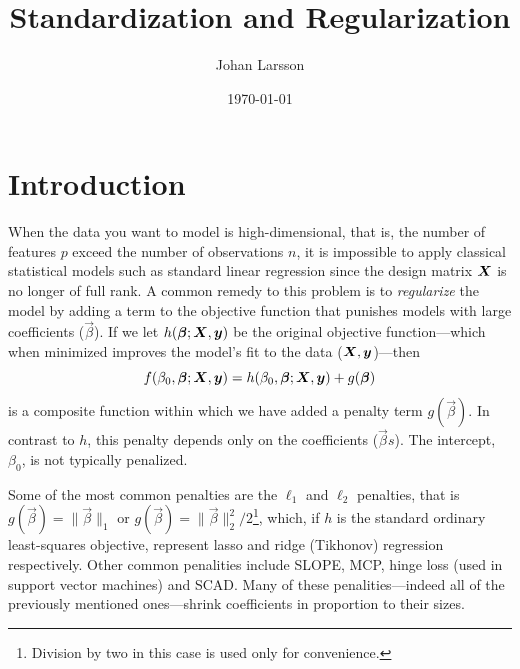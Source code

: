 


\newcommand{\mv}[1]{{\boldsymbol{\mathrm{#1}}}}

\title{Standardization and Regularization}
\author[1,*]{Johan Larsson}
\date{\today}

\usepackage[style=alphabetic]{biblatex}




\maketitle

\section{Introduction}

When the data you want to model is high-dimensional, that is, the number of features \(p\) exceed the number of observations \(n\), it is impossible to apply classical statistical models such as standard linear regression since the design matrix \(\boldsymbol X\) is no longer of full rank. A common remedy to this problem is to \emph{regularize} the model by adding a term to the objective function that punishes models with large coefficients (\(\vec\beta\)). If we let \(h(\boldsymbol\beta; \boldsymbol X, \boldsymbol y)\) be the original objective function---which when minimized improves the model's fit to the data (\(\boldsymbol X, \boldsymbol y\))---then
\[
  f(\beta_0, \boldsymbol\beta; \boldsymbol X, \boldsymbol y) = h(\beta_0, \boldsymbol\beta; \boldsymbol X, \boldsymbol y) + g(\boldsymbol\beta)
\]
is a composite function within which we have added a penalty term \(g(\vec\beta)\).
In contrast to \(h\), this penalty depends only on the coefficients (\(\vec{\beta}s\)).
The intercept, \(\beta_0\), is not typically penalized.

Some of the most common penalties are the \(\ell_1\) and \(\ell_2\) penalties, that is \(g(\vec\beta) = \lVert \vec\beta \rVert_1\) or \(g(\vec\beta) = \lVert \vec\beta \rVert_2^2/2\)\footnote{Division by two in this case is used only for convenience.}, which, if \(h\) is the standard ordinary least-squares objective, represent lasso and ridge (Tikhonov) regression respectively.
Other common penalities include SLOPE, MCP, hinge loss (used in support vector machines) and SCAD.
Many of these penalities---indeed all of the previously mentioned ones---shrink coefficients in proportion to their sizes.

